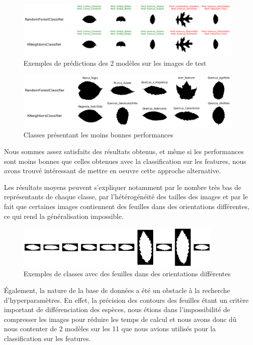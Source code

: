 \documentclass{article}
\begin{document}
\begin{figure}[h]
    \centering
    \includegraphics[width=1\textwidth]{img/img_preds.png}
    \caption{Exemples de prédictions des 2 modèles sur les images de test}
\end{figure}

\begin{figure}[h]
    \centering
    \includegraphics[width=1\textwidth]{img/img_worst_species.png}
    \caption{Classes présentant les moins bonnes performances}
\end{figure}

Nous sommes assez satisfaits des résultats obtenus, et même si les performances
sont moins bonnes que celles obtenues avec la classification sur les features,
nous avons trouvé intéressant de mettre en oeuvre cette approche alternative.

Les résultats moyens peuvent s'expliquer notamment par le nombre très bas
de représentants de chaque classe, par l'hétérogénéité des
tailles des images et par le fait que certaines images contiennent des feuilles
dans des orientations différentes, ce qui rend la généralisation impossible.

\begin{figure}[h]
    \centering
    \includegraphics[width=0.9\textwidth]{img/class55_images.png}
    \caption{Exemples de classes avec des feuilles dans des orientations différentes}
\end{figure}

Également, la nature de la base de données a été un obstacle à la recherche
d'hyperparamètres. En effet, la précision des contours des feuilles étant
un critère important de différenciation des espèces, nous étions dans
l'impossibilité de compresser les images pour réduire les temps de calcul
et nous avons donc dû nous contenter de 2 modèles sur les 11 que nous
avions utilisés pour la classification sur les features.
\end{document}
